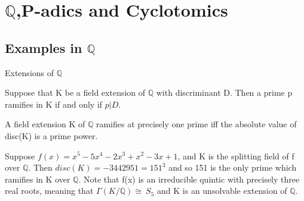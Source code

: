\documentclass[10pt]{beamer}
\theoremstyle{plain} %
\begin{document}
\section{$\mathbb{Q}$,P-adics and Cyclotomics}
\subsection{Examples in $\mathbb{Q}$}
\begin{frame}{Extensions of $\mathbb{Q}$}
    \begin{theorem}
     Suppose that K be a field extension of $\mathbb{Q}$ with discriminant D. Then a prime p
ramifies in K if and only if $p|D$.   
    \end{theorem}
    \begin{corollary}
A field extension K of $\mathbb{Q}$ ramifies at precisely one prime iff the absolute value of disc(K) is a prime power.
\end{corollary}
\begin{example}
    Suppose $f(x)=x^5-5x^4-2x^3+x^2-3x+1$, and K is the splitting field of f over $\mathbb{Q}$. Then $disc(K)=-3442951=151^3$ and so 151 is the only prime which ramifies in K over $\mathbb{Q}$. Note that f(x) is an irreducible quintic with precisely three real roots, meaning that $\Gamma(K/\mathbb{Q})\cong\ S_5$ and K is an unsolvable extension of $\mathbb{Q}$.
\end{example}
\end{frame}
\end{document}
